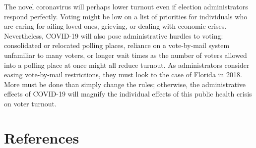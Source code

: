 \documentclass[
  12pt,
]{article}
\begin{document}
The novel coronavirus will perhaps lower turnout even if election administrators respond perfectly. Voting might be low on a list of priorities for individuals who are caring for ailing loved ones, grieving, or dealing with economic crises. Nevertheless, COVID-19 will also pose administrative hurdles to voting: consolidated or relocated polling places, reliance on a vote-by-mail system unfamiliar to many voters, or longer wait times as the number of voters allowed into a polling place at once might all reduce turnout. As administrators consider easing vote-by-mail restrictions, they must look to the case of Florida in 2018. More must be done than simply change the rules; otherwise, the administrative effects of COVID-19 will magnify the individual effects of this public health crisis on voter turnout.

\newpage

\hypertarget{references}{%
\section*{References}\label{references}}
\end{document}

